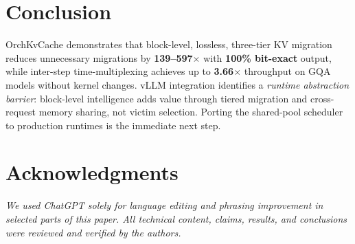 \documentclass[conference]{IEEEtran}
\begin{document}
\section{Conclusion}

OrchKvCache demonstrates that block-level, lossless, three-tier KV migration reduces unnecessary migrations by \textbf{139--597$\times$} with \textbf{100\% bit-exact} output, while inter-step time-multiplexing achieves up to \textbf{3.66$\times$} throughput on GQA models without kernel changes. vLLM integration identifies a \emph{runtime abstraction barrier}: block-level intelligence adds value through tiered migration and cross-request memory sharing, not victim selection. Porting the shared-pool scheduler to production runtimes is the immediate next step.

\section*{Acknowledgments}
\textit{We used ChatGPT solely for language editing and phrasing improvement in selected parts of this paper. All technical content, claims, results, and conclusions were reviewed and verified by the authors.}
\end{document}
